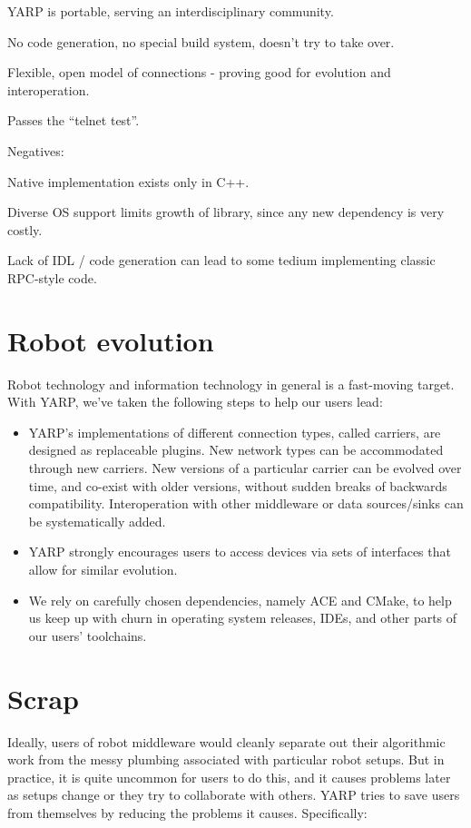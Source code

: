 \documentclass[letterpaper]{article}
\begin{document}
YARP is portable, serving an interdisciplinary community.

No code generation, no special build system, doesn't try to take over.

Flexible, open model of connections - proving good for evolution and interoperation.

Passes the ``telnet test''.

Negatives:

Native implementation exists only in C++.  

Diverse OS support limits growth of library, since any
new dependency is very costly.

Lack of IDL / code generation can lead to some tedium
implementing classic RPC-style code.

\section{Robot evolution}

Robot technology and information technology in general is a
fast-moving target.  With YARP, we've taken the following steps to
help our users lead:

\begin{itemize}

\item YARP's implementations of different connection types, called
carriers, are designed as replaceable plugins.  New network types can
be accommodated through new carriers.  New versions of a particular
carrier can be evolved over time, and co-exist with older versions,
without sudden breaks of backwards compatibility.  Interoperation
with other middleware or data sources/sinks can be systematically
added.

\item YARP strongly encourages users to access devices via sets of
interfaces that allow for similar evolution.

\item We rely on carefully chosen dependencies, namely ACE and CMake,
to help us keep up with churn in operating system releases, IDEs, and
other parts of our users' toolchains.

\end{itemize}

\section{Scrap}


Ideally, users of robot middleware would cleanly separate out their
algorithmic work from the messy plumbing associated with particular
robot setups.  But in practice, it is quite uncommon for users to do
this, and it causes problems later as setups change or they try to
collaborate with others.  YARP tries to save users from themselves
by reducing the problems it causes.  Specifically:
\end{document}
